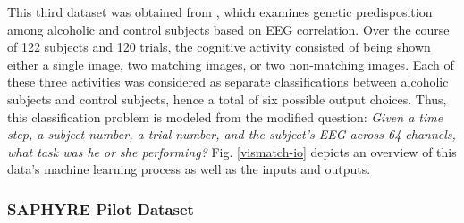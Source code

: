 \documentclass[12pt]{uthesis-v12}  %
\begin{document}
This third dataset was obtained from \cite{uci}, which examines genetic predisposition among alcoholic and control subjects based on EEG correlation. Over the course of 122 subjects and 120 trials, the cognitive activity consisted of being shown either a single image, two matching images, or two non-matching images. Each of these three activities was considered as separate classifications between alcoholic subjects and control subjects, hence a total of six possible output choices. Thus, this classification problem is modeled from the modified question: \textit{Given a time step, a subject number, a trial number, and the subject’s EEG across 64 channels, what task was he or she performing?} Fig. \ref{vismatch-io} depicts an overview of this data's machine learning process as well as the inputs and outputs.

\subsubsection{SAPHYRE Pilot Dataset}
%
\end{document}
